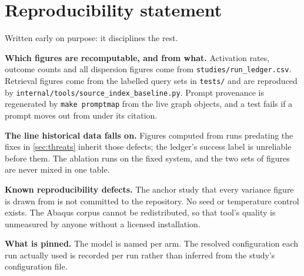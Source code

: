 \section{Reproducibility statement}
\label{sec:reproducibility}

Written early on purpose: it disciplines the rest.

\textbf{Which figures are recomputable, and from what.} Activation rates,
outcome counts and all dispersion figures come from
\texttt{studies/run\_ledger.csv}. Retrieval figures come from the labelled
query sets in \texttt{tests/} and are reproduced by
\texttt{internal/tools/source\_index\_baseline.py}. Prompt provenance is
regenerated by \texttt{make promptmap} from the live graph objects, and a test
fails if a prompt moves out from under its citation.

\textbf{The line historical data falls on.} Figures computed from runs
predating the fixes in \cref{sec:threats} inherit those defects; the ledger's
success label is unreliable before them. The ablation runs on the fixed system,
and the two sets of figures are never mixed in one table.

\textbf{Known reproducibility defects.} The anchor study that every variance
figure is drawn from is not committed to the repository. No seed or temperature
control exists. The Abaqus corpus cannot be redistributed, so that tool's
quality is unmeasured by anyone without a licensed installation.

\textbf{What is pinned.} The model is named per arm. The resolved configuration
each run actually used is recorded per run rather than inferred from the
study's configuration file.
